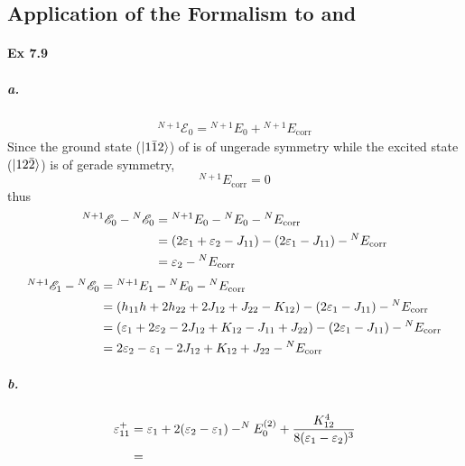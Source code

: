 \documentclass[a4paper]{article}
\DeclareMathOperator{\corr}{\mathrm{corr}}
\newcommand{\ex}[1]{\paragraph{Ex #1}}
\newcommand{\subex}[1]{\subparagraph{#1}}
\numberwithin{equation}{subsection}
\begin{document}
\subsection{Application of the Formalism to  and }
\ex{7.9}
\subex{a.}
\begin{align}
^{N+1}\mathscr{E}_0 = {^{N+1}E_0} + {^{N+1}E_{\corr}}
\end{align}
Since the ground state ($ \ket{1\bar{1}2} $) of  is of ungerade symmetry while the excited state ($ \ket{12\bar{2}} $) is of gerade symmetry, 
\begin{equation}\label{key}
{^{N+1}E_{\corr}} = 0
\end{equation}
thus
\begin{align}
^{N+1}\mathscr{E}_0 - {^N}\mathscr{E}_0 &= {^{N+1}E_0} - {^{N}E_0} - {^N}E_{\corr} \notag\\
&= (2\varepsilon_1 + \varepsilon_2 -J_{11}) - (2\varepsilon_1 - J_{11}) - {^N}E_{\corr} \notag\\
&= \varepsilon_2 - {^N}E_{\corr} 
\end{align}
\begin{align}
^{N+1}\mathscr{E}_1 - {^N}\mathscr{E}_0 &= {^{N+1}E_1} - {^{N}E_0} - {^N}E_{\corr} \notag\\
&= (h_{11} h + 2h_{22} + 2J_{12} + J_{22} - K_{12}) - (2\varepsilon_1 - J_{11}) - {^N}E_{\corr} \notag\\
&= (\varepsilon_1 + 2\varepsilon_2 - 2J_{12} + K_{12} - J_{11} + J_{22}) - (2\varepsilon_1 - J_{11}) - {^N}E_{\corr} \notag\\
&= 2\varepsilon_2 - \varepsilon_1 - 2J_{12} + K_{12} + J_{22} - {^N}E_{\corr}
\end{align}
\subex{b.}
\begin{align}
\varepsilon_{11}^+ &= \varepsilon_1 + 2(\varepsilon_2 - \varepsilon_1) - ^NE_0^{(2)} + \dfrac{K_{12}^4}{8(\varepsilon_1 - \varepsilon_2)^3} \notag\\
&=
\end{align}
\end{document}

